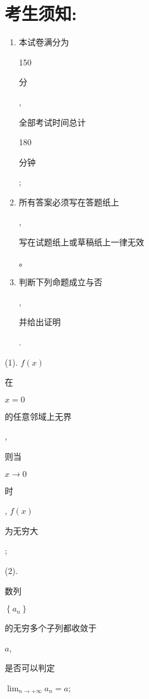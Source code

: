 \documentclass[10pt]{article}
\begin{document}
\section{考生须知:}
\begin{enumerate}
  \item \begin{CJK}{UTF8}{mj}本试卷满分为\end{CJK} 150 \begin{CJK}{UTF8}{mj}分\end{CJK}, \begin{CJK}{UTF8}{mj}全部考试时间总计\end{CJK} 180 \begin{CJK}{UTF8}{mj}分钟\end{CJK};

  \item \begin{CJK}{UTF8}{mj}所有答案必须写在答题纸上\end{CJK}, \begin{CJK}{UTF8}{mj}写在试题纸上或草稿纸上一律无效\end{CJK}。

  \item \begin{CJK}{UTF8}{mj}判断下列命题成立与否\end{CJK}, \begin{CJK}{UTF8}{mj}并给出证明\end{CJK}.

\end{enumerate}
(1). $f(x)$ \begin{CJK}{UTF8}{mj}在\end{CJK} $x=0$ \begin{CJK}{UTF8}{mj}的任意邻域上无界\end{CJK}, \begin{CJK}{UTF8}{mj}则当\end{CJK} $x \rightarrow 0$ \begin{CJK}{UTF8}{mj}时\end{CJK}, $f(x)$ \begin{CJK}{UTF8}{mj}为无穷大\end{CJK};

(2). \begin{CJK}{UTF8}{mj}数列\end{CJK} $\left\{a_{n}\right\}$ \begin{CJK}{UTF8}{mj}的无穷多个子列都收敛于\end{CJK} $a$, \begin{CJK}{UTF8}{mj}是否可以判定\end{CJK} $\lim _{n \rightarrow+\infty} a_{n}=a$;
\end{document}
